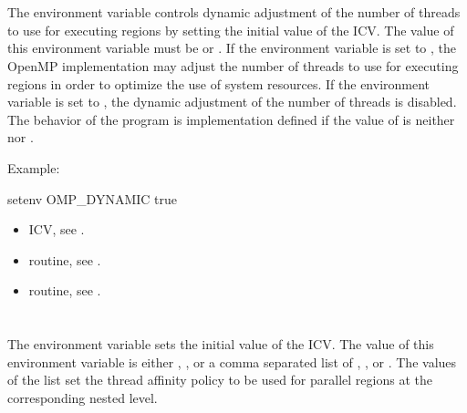 \section{}
\label{sec:OMP_DYNAMIC}
The  environment variable controls dynamic adjustment of the number 
of threads to use for executing  regions by setting the initial value of the 
 ICV. The value of this environment variable must be  or . If the 
environment variable is set to , the OpenMP implementation may adjust the 
number of threads to use for executing  regions in order to optimize the use 
of system resources. If the environment variable is set to , the dynamic 
adjustment of the number of threads is disabled. The behavior of the program is 
implementation defined if the value of  is neither  nor .

Example:
\begin{boxedcode}
setenv OMP\_DYNAMIC true
\end{boxedcode}

\crossreferences
\begin{itemize}
\item {} ICV, see .

\item {} routine, see .

\item {} routine, see .
\end{itemize}









\section{}
\label{sec:OMP_PROC_BIND}
The  environment variable sets the initial value of the  ICV. 
The value of this environment variable is either , , or a comma separated 
list of , , or . The values of the list set the thread affinity policy 
to be used for parallel regions at the corresponding nested level.

